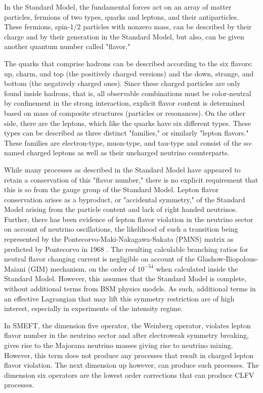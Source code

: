 \documentclass[12pt]{article}
\begin{document}
In the Standard Model, the fundamental forces act on an array of matter particles, fermions of two types, quarks and leptons, and their antiparticles. These fermions, spin-1/2 particles with nonzero mass, can be described by their charge and by their generation in the Standard Model, but also, can be given another quantum number called "flavor." 

The quarks that comprise hadrons can be described according to the six flavors: up, charm, and top (the positively charged versions) and the down, strange, and bottom (the negatively charged ones). Since these charged particles are only found inside hadrons, that is, all observable combinations must be color-neutral by confinement in the strong interaction, explicit flavor content is determined based on mass of composite structures (particles or resonances). On the other side, there are the leptons, which like the quarks have six different types. These types can be described as three distinct "families," or similarly "lepton flavors." These families are electron-type, muon-type, and tau-type and consist of the so-named charged leptons as well as their uncharged neutrino counterparts.  

While many processes as described in the Standard Model have appeared to retain a conservation of this "flavor number," there is no explicit requirement that this is so from the gauge group of the Standard Model. Lepton flavor conservation arises as a byproduct, or "accidental symmetry," of the Standard Model \cite{CalibbiSignorelli2018CLFVIntro} arising from the particle content and lack of right handed neutrinos. Further, there has been evidence of lepton flavor violation in the neutrino sector on account of neutrino oscillations, the likelihood of such a transition being represented by the Pontecorvo-Maki-Nakagawa-Sakata (PMNS) matrix as predicted by Pontecorvo in 1968 \cite{Pontecorvo1968NeutrinoLeptonCharge}. The resulting calculable branching ratios for neutral flavor changing current is negligible on account of the Glashow-Iliopolous-Maiani (GIM) mechanism, on the order of $10^{-54}$ \cite{GIMMechanism1970} when calculated inside the Standard Model. However, this assumes that the Standard Model is complete, without additional terms from BSM physics models. As such, additional terms in an effective Lagrangian that may lift this symmetry restriction are of high interest, especially in experiments of the intensity regime.

In SMEFT, the dimension five operator, the Weinberg operator, \cite{Brivio_2019} violates lepton flavor number in the neutrino sector and after electroweak symmetry breaking, gives rise to the Majorana neutrino masses giving rise to neutrino mixing. However, this term does not produce any processes that result in charged lepton flavor violation. The next dimension up however, can produce such processes. The dimension six operators are the lowest order corrections that can produce CLFV processes.
\end{document}
